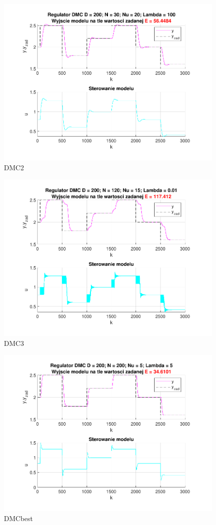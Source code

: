 \begin{figure}[H]
    \centering
    \includegraphics[scale=0.90]{../projekt/zad4_5/DMC_pdf/DMC_2.pdf}
    \caption{DMC2}
\end{figure}

\begin{figure}[H]
    \centering
    \includegraphics[scale=0.90]{../projekt/zad4_5/DMC_pdf/DMC_3.pdf}
    \caption{DMC3}
\end{figure}

\begin{figure}[H]
    \centering
    \includegraphics[scale=0.90]{../projekt/zad4_5/DMC_pdf/DMC_best.pdf}
    \caption{DMCbest}
\end{figure}


